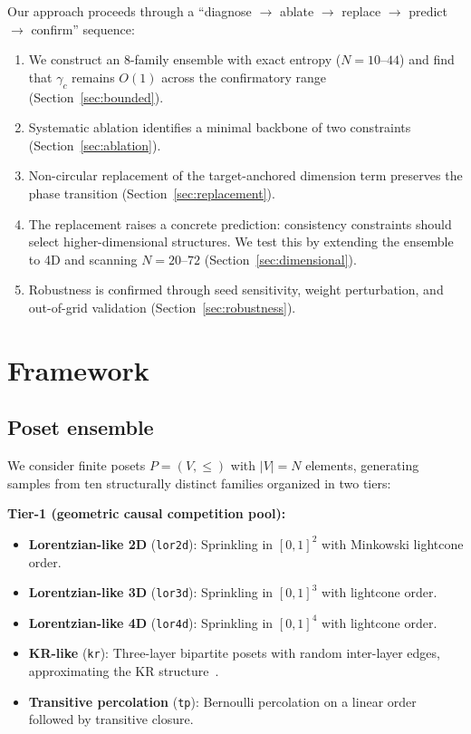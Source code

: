 \documentclass[12pt,a4paper]{article}
\begin{document}
Our approach proceeds through a ``diagnose $\to$ ablate $\to$ replace $\to$
predict $\to$ confirm'' sequence:

\begin{enumerate}[nosep]
\item We construct an 8-family ensemble with exact entropy ($N = 10$--$44$) and
find that $\gamma_c$ remains $O(1)$ across the confirmatory range
(Section~\ref{sec:bounded}).
\item Systematic ablation identifies a minimal backbone of two constraints
(Section~\ref{sec:ablation}).
\item Non-circular replacement of the target-anchored dimension term preserves
the phase transition (Section~\ref{sec:replacement}).
\item The replacement raises a concrete prediction: consistency constraints
should select higher-dimensional structures. We test this by extending the
ensemble to 4D and scanning $N = 20$--$72$
(Section~\ref{sec:dimensional}).
\item Robustness is confirmed through seed sensitivity, weight perturbation, and
out-of-grid validation (Section~\ref{sec:robustness}).
\end{enumerate}

\section{Framework}
\label{sec:framework}

\subsection{Poset ensemble}
\label{sec:ensemble}

We consider finite posets $P = (V, \leq)$ with $|V| = N$ elements, generating
samples from ten structurally distinct families organized in two tiers:

\medskip
\noindent\textbf{Tier-1 (geometric causal competition pool):}
\begin{itemize}[nosep]
\item \textbf{Lorentzian-like 2D} (\texttt{lor2d}): Sprinkling in $[0,1]^2$
with Minkowski lightcone order.
\item \textbf{Lorentzian-like 3D} (\texttt{lor3d}): Sprinkling in $[0,1]^3$
with lightcone order.
\item \textbf{Lorentzian-like 4D} (\texttt{lor4d}): Sprinkling in $[0,1]^4$
with lightcone order.
\item \textbf{KR-like} (\texttt{kr}): Three-layer bipartite posets with random
inter-layer edges, approximating the KR structure~\cite{kleitman1975}.
\item \textbf{Transitive percolation} (\texttt{tp}): Bernoulli percolation on a
linear order followed by transitive closure.
\end{itemize}
\end{document}
